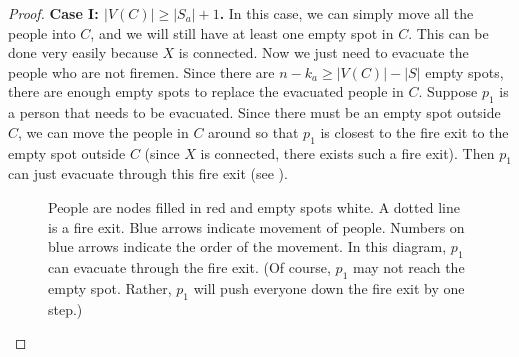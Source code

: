 \documentclass{mystyle}
\begin{document}
\begin{proof}
    \textbf{Case I: $|V(C)| \geq |S_a| + 1$.} In this case, we can simply move all the people into $C$, and we will still have at least one empty spot in $C$. This can be done very easily because $X$ is connected. Now we just need to evacuate the people who are not firemen. Since there are $n - k_a \geq |V(C)| - |S|$ empty spots, there are enough empty spots to replace the evacuated people in $C$. Suppose $p_1$ is a person that needs to be evacuated. Since there must be an empty spot outside $C$, we can move the people in $C$ around so that $p_1$ is closest to the fire exit to the empty spot outside $C$ (since $X$ is connected, there exists such a fire exit). Then $p_1$ can just evacuate through this fire exit (see ). 

    \begin{figure}[ht]
        \centering
        \caption{People are nodes filled in red and empty spots white. A dotted line is a fire exit. Blue arrows indicate movement of people. Numbers on blue arrows indicate the order of the movement. In this diagram, $p_1$ can evacuate through the fire exit. (Of course, $p_1$ may not reach the empty spot. Rather, $p_1$ will push everyone down the fire exit by one step.)}
        \label{fig_2}
    \end{figure}


\end{proof}
\end{document}
